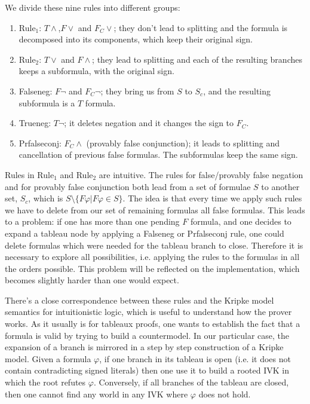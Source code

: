We divide these nine rules into different groups:

\begin{enumerate}
    \item Rule$_1$: $T\wedge$,$F\vee$ and $F_C\vee$; they don't lead to splitting and the formula is decomposed into its components, which keep their original sign. 
    \item Rule$_2$: $T\vee$ and $F\wedge$; they lead to splitting and each of the resulting branches keeps a subformula, with the original sign. 
    \item Falseneg: $F\neg$ and $F_C\neg$; they bring us from $S$ to $S_c$, and the resulting subformula is a $T$ formula. 
    \item Trueneg: $T\neg$; it deletes negation and it changes the sign to $F_C$.
    \item Prfalseconj: $F_C\wedge$ (provably false conjunction); it leads to splitting and cancellation of previous false formulas. The subformulas keep the same sign. 
\end{enumerate}

Rules in Rule$_1$ and Rule$_2$  are intuitive. The rules for false/provably false negation and for provably false conjunction both lead from a set of formulae $S$ to another set, $S_c$, which is $S \setminus \{F \varphi|F\varphi \in S\}$. The idea is that every time we apply such rules we have to delete from our set of remaining formulas all false formulas. This leads to a problem: if one has more than one pending $F$ formula, and one decides to expand a tableau node by applying a Falseneg or Prfalseconj rule, one could delete formulas which were needed for the tableau branch to close. Therefore it is necessary to explore all possibilities, i.e. applying the rules to the formulas in all the orders possible. This problem will be reflected on the implementation, which becomes slightly harder than one would expect.

There's a close correspondence between these rules and the Kripke model semantics for intuitionistic logic, which is useful to understand how the prover works. As it usually is for tableaux proofs, one wants to establish the fact that a formula is valid by trying to build a countermodel. In our particular case, the expansion of a branch is mirrored in a step by step construction of a Kripke model. Given a formula $\varphi$, if one branch in its tableau is open (i.e. it does not contain contradicting signed literals) then one use it to build a rooted IVK in which the root refutes $\varphi$. Conversely, if all branches of the tableau are closed, then one cannot find any world in any IVK where $\varphi$ does not hold.\\

